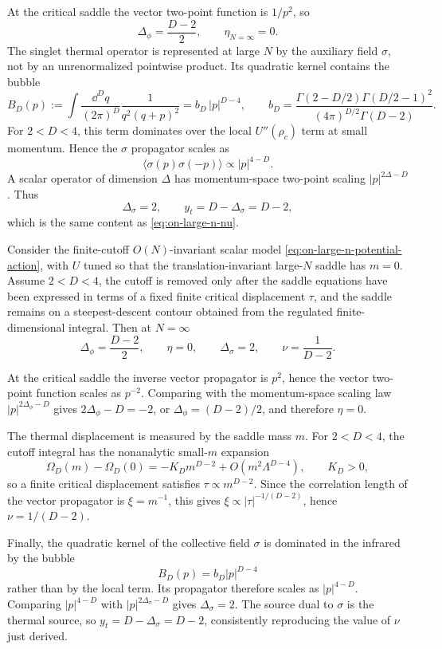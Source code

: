At the critical saddle the vector two-point function is \(1/p^2\), so
\[
  \Delta_\phi=\frac{D-2}{2},
  \qquad
  \eta_{N=\infty}=0.
\]
The singlet thermal operator is represented at large \(N\) by the auxiliary
field \(\sigma\), not by an unrenormalized pointwise product.  Its quadratic
kernel contains the bubble
\begin{equation}
  B_D(p)
  :=
  \int\frac{\dd^D q}{(2\pi)^D}
  \frac1{q^2(q+p)^2}
  =
  b_D\,|p|^{D-4},
  \qquad
  b_D=
  \frac{\Gamma(2-D/2)\Gamma(D/2-1)^2}
       {(4\pi)^{D/2}\Gamma(D-2)} .
  \label{eq:on-large-n-bubble}
\end{equation}
For \(2<D<4\), this term dominates over the local \(U''(\rho_c)\) term at
small momentum.  Hence the \(\sigma\) propagator scales as
\[
  \langle\sigma(p)\sigma(-p)\rangle \propto |p|^{4-D}.
\]
A scalar operator of dimension \(\Delta\) has momentum-space two-point
scaling \(|p|^{2\Delta-D}\).  Thus
\begin{equation}
  \Delta_\sigma=2,
  \qquad
  y_t=D-\Delta_\sigma=D-2,
  \label{eq:on-large-n-sigma-dimension}
\end{equation}
which is the same content as \eqref{eq:on-large-n-nu}.

\begin{example}
\label{ex:on-large-n-critical-saddle}
Consider the finite-cutoff \(O(N)\)-invariant scalar model
\eqref{eq:on-large-n-potential-action}, with \(U\) tuned so that the
translation-invariant large-\(N\) saddle has \(m=0\).  Assume \(2<D<4\), the
cutoff is removed only after the saddle equations have been expressed in terms
of a fixed finite critical displacement \(\tau\), and the saddle remains on a
steepest-descent contour obtained from the regulated finite-dimensional
integral.  Then at \(N=\infty\)
\[
  \Delta_\phi=\frac{D-2}{2},
  \qquad
  \eta=0,
  \qquad
  \Delta_\sigma=2,
  \qquad
  \nu=\frac1{D-2}.
\]

At the critical saddle the inverse vector propagator is \(p^2\), hence the
vector two-point function scales as \(p^{-2}\).  Comparing with the
momentum-space scaling law
\(|p|^{2\Delta_\phi-D}\) gives
\(2\Delta_\phi-D=-2\), or
\(\Delta_\phi=(D-2)/2\), and therefore \(\eta=0\).

The thermal displacement is measured by the saddle mass \(m\).  For
\(2<D<4\), the cutoff integral has the nonanalytic small-\(m\) expansion
\[
  \Omega_D(m)-\Omega_D(0)=-K_Dm^{D-2}+O(m^2\Lambda^{D-4}),
  \qquad K_D>0,
\]
so a finite critical displacement satisfies
\(\tau\propto m^{D-2}\).  Since the correlation length of the vector
propagator is \(\xi=m^{-1}\), this gives
\(\xi\propto |\tau|^{-1/(D-2)}\), hence \(\nu=1/(D-2)\).

Finally, the quadratic kernel of the collective field \(\sigma\) is dominated
in the infrared by the bubble
\[
  B_D(p)=b_D|p|^{D-4}
\]
rather than by the local term.  Its propagator therefore scales as
\(|p|^{4-D}\).  Comparing
\(|p|^{4-D}\) with \(|p|^{2\Delta_\sigma-D}\) gives
\(\Delta_\sigma=2\).  The source dual to \(\sigma\) is the thermal source, so
\(y_t=D-\Delta_\sigma=D-2\), consistently reproducing the value of \(\nu\)
just derived.
\end{example}

